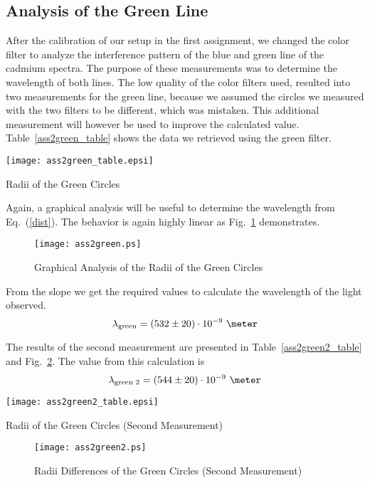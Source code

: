 \documentclass[a4paper,10pt]{article}
\begin{document}
\subsection{Analysis of the Green Line}
After the calibration of our setup in the first assignment, we changed the color filter to analyze the interference pattern of the blue and green line of the cadmium spectra. The purpose of these measurements was to determine the wavelength of both lines. The low quality of the color filters used, resulted into two measurements for the green line, because we assumed the circles we measured with the two filters to be different, which was mistaken. This additional measurement will however be used to improve the calculated value. Table~\ref{ass2green_table} shows the data we retrieved using the green filter.
\begin{table}[h]
    \centering
    \texttt{[image: ass2green\_table.epsi]}
    \caption{Radii of the Green Circles}
    \label{ass2green_table}
\end{table}

Again, a graphical analysis will be useful to determine the wavelength from Eq.~(\ref{dist}). The behavior is again highly linear as Fig.~\ref{ass2green} demonstrates.
\begin{figure}[h]
    \centering
    \texttt{[image: ass2green.ps]}
    \caption{Graphical Analysis of the Radii of the Green Circles}
    \label{ass2green}
\end{figure}
From the slope we get the required values to calculate the wavelength of the light observed.
\begin{equation*}
\lambda_\text{green} = (532 \pm 20) \cdot 10^{-9} \text{ \meter}
\end{equation*}
\pagebreak

The results of the second measurement are presented in Table~\ref{ass2green2_table} and Fig.~\ref{ass2green2}. The value from this calculation is
\begin{equation*}
\lambda_\text{green 2} = (544 \pm 20) \cdot 10^{-9} \text{ \meter}
\end{equation*}
\begin{table}[h]
    \centering
    \texttt{[image: ass2green2\_table.epsi]}
    \caption{Radii of the Green Circles (Second Measurement)}
    \label{ass2green2_table}
\end{table}
\begin{figure}[h]
    \centering
    \texttt{[image: ass2green2.ps]}
    \caption{Radii Differences of the Green Circles (Second Measurement)}
    \label{ass2green2}
\end{figure}
\end{document}
